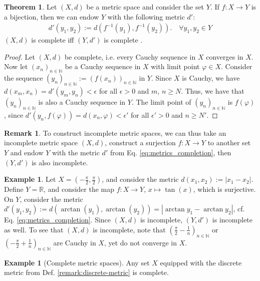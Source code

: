 \documentclass[12pt, a4paper]{article}
\numberwithin{equation}{section}
\theoremstyle{definition}
\theoremstyle{definition}
\newtheorem{exmp}[thm]{Example} %
\newtheorem{remark}[thm]{Remark} %
\newtheorem{theorem}[thm]{Theorem}
\newcommand{\abs}[1]{\left\vert #1 \right\vert}
\begin{document}
	\begin{theorem}
		Let $(X, d)$ be a metric space and consider the set $Y$. If $f: X\to Y$ is a bijection, then we can endow $Y$ with the following metric $d'$:
		\begin{align}\label{eq:metrics_completion}
			d'(y_1, y_2) := d\left(f^{-1}(y_1), f^{-1}(y_2)\right). \quad \forall y_1, y_2\in Y
		\end{align}
		$(X, d)$ is complete iff $(Y, d')$ is complete \cite{3789234}.
	\end{theorem}
	
	\begin{proof}
		Let $(X, d)$ be complete, i.e. every Cauchy sequence in $X$ converges in $X$. Now let $(x_n)_{n\in\mathbb N}$ be a Cauchy sequence in $X$ with limit point $\varphi\in X$. Consider the sequence $(y_n)_{n\in\mathbb N} := \left(f(x_n)\right)_{n\in\mathbb N}$ in $Y$. Since $X$ is Cauchy, we have $ d(x_m, x_n) = d'(y_m, y_n) < \epsilon$ for all $\epsilon > 0$ and $m$, $n\geq N$. Thus, we have that $(y_{n})_{n\in\mathbb N}$ is also a Cauchy sequence in $Y$. The limit point of $\left(y_n\right)_{n\in\mathbb N}$ is $f(\varphi)$, since $d'(y_n, f(\varphi)) = d(x_n, \varphi) < \epsilon'$ for all $\epsilon' > 0$ and $n\geq N'$.
	\end{proof}

	\begin{remark}
		To construct incomplete metric spaces, we can thus take an incomplete metric space $(X, d)$, construct a surjection $f:X\to Y$ to another set $Y$ and endow $Y$ with the metric $d'$ from Eq. \eqref{eq:metrics_completion}, then $(Y, d')$ is also incomplete.
	\end{remark}
	
	\begin{exmp}
		Let $X = \left(-\frac{\pi}{2}, \frac{\pi}{2}\right)$, and consider the metric $d(x_1, x_2) := \abs{x_1 - x_2}$. Define $Y = \mathbb R$, and consider the map $f: X\to Y$, $x\mapsto \tan(x)$, which is surjective. On $Y$, consider the metric $d'(y_1, y_2) := d\left( \arctan(y_1), \arctan(y_2)\right) = \abs{\arctan y_1 - \arctan y_2}$, cf. Eq. \eqref{eq:metrics_completion}. Since $(X, d)$ is incomplete, $(Y, d')$ is incomplete as well. To see that $(X, d)$ is incomplete, note that $\left(\frac{\pi}{2} - \frac{1}{n}\right)_{n\in\mathbb N}$ or $\left( -\frac{\pi}{2} + \frac{1}{n} \right)_{n\in\mathbb N}$ are Cauchy in $X$, yet do not converge in $X$.
	\end{exmp}
	
	\begin{exmp}[Complete metric spaces]
		Any set $X$ equipped with the discrete metric from Def. \ref{remark:discrete-metric} is complete.
	\end{exmp}
	
\end{document}
